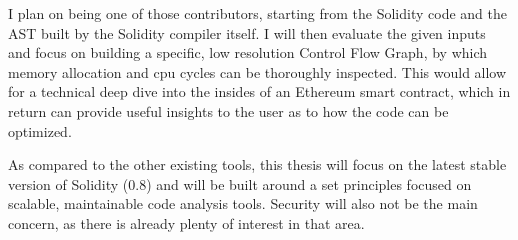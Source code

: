 I plan on being one of those contributors, starting from the Solidity code and the AST built by the Solidity compiler itself. I will then evaluate the given inputs and focus on building a specific, low resolution Control Flow Graph, by which memory allocation and cpu cycles can be thoroughly inspected. This would allow for a technical deep dive into the insides of an Ethereum smart contract, which in return can provide useful insights to the user as to how the code can be optimized.

As compared to the other existing tools, this thesis will focus on the latest stable version of Solidity (0.8) and will be built around a set principles focused on scalable, maintainable code analysis tools. Security will also not be the main concern, as there is already plenty of interest in that area.


